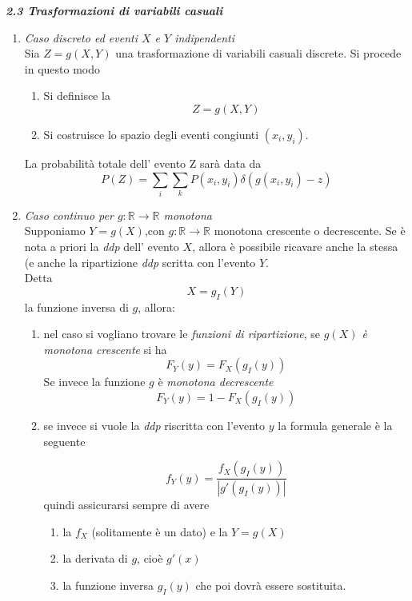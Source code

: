 \documentclass[]{article}
\newcommand{\numberset}{\mathbb}
\newcommand{\R}{\numberset{R}}
\begin{document}
\newpage

\textit{\textbf{2.3 Trasformazioni di variabili casuali}}

\begin{enumerate}
\item \textit{Caso discreto ed eventi $X$ e $Y$ indipendenti}\\
Sia $Z=g \left( X,Y \right)$  una trasformazione di variabili casuali discrete. Si procede in questo modo
\begin{enumerate}
\item Si definisce la 
\[ Z=g \left( X,Y \right) \]
\item Si costruisce lo spazio degli eventi congiunti $(x_i,y_i)$.
\\
\end{enumerate}
La probabilità totale dell' evento Z sarà data da
\begin{equation}
P(Z)= \sum_i \sum_k P(x_i,y_i) \delta(g(x_i,y_i)-z)
\end{equation}

\item \textit{Caso continuo per $g: \R \to \R$ monotona}
\\
Supponiamo $Y=g(X)$,con $g: \R \to \R$ monotona crescente o decrescente. Se è nota a priori la \textit{ddp} dell' evento $X$, allora è possibile ricavare anche la stessa (e anche la ripartizione \textit{ddp} scritta con l'evento $Y$.
\\
Detta 
\[X= g_I (Y) \]
la funzione inversa di $g$, allora:

\begin{enumerate}
\item nel caso si vogliano trovare le \textit{funzioni di ripartizione}, se \textit{$g(X)$ è monotona crescente} si ha
\begin{equation}
F_Y (y)= F_X(g_I(y))
\end{equation}
Se invece la funzione $g$ è \textit{monotona decrescente}
\begin{equation}
F_Y(y)=1-F_X(g_I(y))
\end{equation}

\item se invece si vuole la \textit{ddp} riscritta con l'evento $y$ la formula generale è la seguente

\begin{equation}
f_Y(y)=\frac{f_X(g_I(y))}{|g'(g_I(y))|}
\end{equation}
quindi assicurarsi sempre di avere
\begin{enumerate}
\item la $f_X$ (solitamente è un dato) e la $Y=g(X)$
\item la derivata di $g$, cioè $g'(x)$
\item la funzione inversa $g_I(y)$ che poi dovrà essere sostituita.
\end{enumerate}


\end{enumerate}
\end{enumerate}
\end{document}
